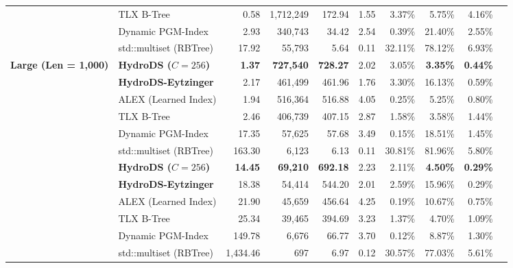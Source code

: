 \documentclass[10pt,twocolumn,letterpaper]{article}
\theoremstyle{definition}
\begin{document}
\begin{table}[t]
\begin{tabular}{@{}llrrrrrrrr@{}}
\rowcolor{rowgray}
  & TLX B-Tree                    & 0.58 & 1,712,249 & 172.94 & 1.55 & 3.37\% & 5.75\% & 4.16\%\\
\rowcolor{rowgray}
  & Dynamic PGM-Index             & 2.93 & 340,743 & 34.42 & 2.54 & 0.39\% & 21.40\% & 2.55\%\\
\rowcolor{rowgray}
  & std::multiset (RBTree)        & 17.92 & 55,793 & 5.64 & 0.11 & 32.11\% & 78.12\% & 6.93\%\\
\midrule
\multirow{6}{*}{\textbf{Large (Len = 1,000)}}
  & \textbf{HydroDS ($C{=}256$)}   & \textbf{1.37} & \textbf{727,540} & \textbf{728.27} & 2.02 & 3.05\% & \textbf{3.35\%} & \textbf{0.44\%}\\
  & \textbf{HydroDS-Eytzinger}     & 2.17 & 461,499 & 461.96 & 1.76 & 3.30\% & 16.13\% & 0.59\%\\
  & ALEX (Learned Index)          & 1.94 & 516,364 & 516.88 & 4.05 & 0.25\% & 5.25\% & 0.80\%\\
  & TLX B-Tree                    & 2.46 & 406,739 & 407.15 & 2.87 & 1.58\% & 3.58\% & 1.44\%\\
  & Dynamic PGM-Index             & 17.35 & 57,625 & 57.68 & 3.49 & 0.15\% & 18.51\% & 1.45\%\\
  & std::multiset (RBTree)        & 163.30 & 6,123 & 6.13 & 0.11 & 30.81\% & 81.96\% & 5.80\%\\
\midrule
\rowcolor{rowgray}
\multirow{6}{*}{\textbf{Extra Large (Len = 10k)}}
  & \textbf{HydroDS ($C{=}256$)}   & \textbf{14.45} & \textbf{69,210} & \textbf{692.18} & 2.23 & 2.11\% & \textbf{4.50\%} & \textbf{0.29\%}\\
\rowcolor{rowgray}
  & \textbf{HydroDS-Eytzinger}     & 18.38 & 54,414 & 544.20 & 2.01 & 2.59\% & 15.96\% & 0.29\%\\
\rowcolor{rowgray}
  & ALEX (Learned Index)          & 21.90 & 45,659 & 456.64 & 4.25 & 0.19\% & 10.67\% & 0.75\%\\
\rowcolor{rowgray}
  & TLX B-Tree                    & 25.34 & 39,465 & 394.69 & 3.23 & 1.37\% & 4.70\% & 1.09\%\\
\rowcolor{rowgray}
  & Dynamic PGM-Index             & 149.78 & 6,676 & 66.77 & 3.70 & 0.12\% & 8.87\% & 1.30\%\\
\rowcolor{rowgray}
  & std::multiset (RBTree)        & 1,434.46 & 697 & 6.97 & 0.12 & 30.57\% & 77.03\% & 5.61\%\\
\bottomrule
\end{tabular}
\end{table}
\end{document}
